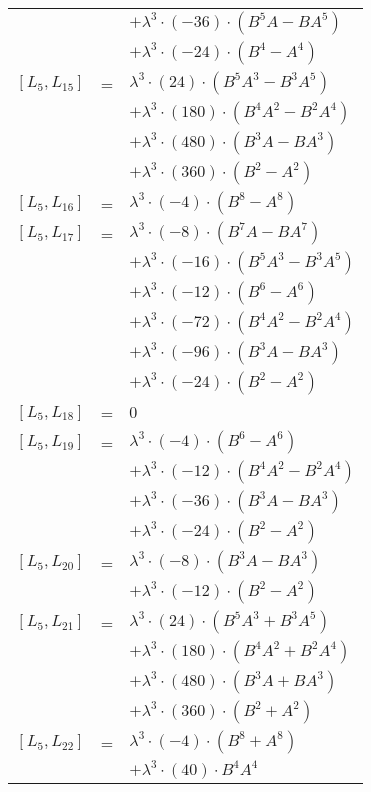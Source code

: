 \documentclass{article}
\begin{document}
\begin{center}
\begin{longtable}{lll}
 & & $ + {\lambda}^3{\cdot}(-36){\cdot}(B^{5}A-BA^{5})$ \\*
 & & $ + {\lambda}^3{\cdot}(-24){\cdot}(B^{4}-A^{4})$ \\
$[L_{5},L_{15}]$ & = & ${\lambda}^3{\cdot}(24){\cdot}(B^{5}A^{3}-B^{3}A^{5})$ \\*
 & & $ + {\lambda}^3{\cdot}(180){\cdot}(B^{4}A^{2}-B^{2}A^{4})$ \\*
 & & $ + {\lambda}^3{\cdot}(480){\cdot}(B^{3}A-BA^{3})$ \\*
 & & $ + {\lambda}^3{\cdot}(360){\cdot}(B^{2}-A^{2})$ \\
$[L_{5},L_{16}]$ & = & ${\lambda}^3{\cdot}(-4){\cdot}(B^{8}-A^{8})$ \\
$[L_{5},L_{17}]$ & = & ${\lambda}^3{\cdot}(-8){\cdot}(B^{7}A-BA^{7})$ \\*
 & & $ + {\lambda}^3{\cdot}(-16){\cdot}(B^{5}A^{3}-B^{3}A^{5})$ \\*
 & & $ + {\lambda}^3{\cdot}(-12){\cdot}(B^{6}-A^{6})$ \\*
 & & $ + {\lambda}^3{\cdot}(-72){\cdot}(B^{4}A^{2}-B^{2}A^{4})$ \\*
 & & $ + {\lambda}^3{\cdot}(-96){\cdot}(B^{3}A-BA^{3})$ \\*
 & & $ + {\lambda}^3{\cdot}(-24){\cdot}(B^{2}-A^{2})$ \\
$[L_{5},L_{18}]$ & = & $ 0 $ \\
$[L_{5},L_{19}]$ & = & ${\lambda}^3{\cdot}(-4){\cdot}(B^{6}-A^{6})$ \\*
 & & $ + {\lambda}^3{\cdot}(-12){\cdot}(B^{4}A^{2}-B^{2}A^{4})$ \\*
 & & $ + {\lambda}^3{\cdot}(-36){\cdot}(B^{3}A-BA^{3})$ \\*
 & & $ + {\lambda}^3{\cdot}(-24){\cdot}(B^{2}-A^{2})$ \\
$[L_{5},L_{20}]$ & = & ${\lambda}^3{\cdot}(-8){\cdot}(B^{3}A-BA^{3})$ \\*
 & & $ + {\lambda}^3{\cdot}(-12){\cdot}(B^{2}-A^{2})$ \\
$[L_{5},L_{21}]$ & = & ${\lambda}^3{\cdot}(24){\cdot}(B^{5}A^{3}+B^{3}A^{5})$ \\*
 & & $ + {\lambda}^3{\cdot}(180){\cdot}(B^{4}A^{2}+B^{2}A^{4})$ \\*
 & & $ + {\lambda}^3{\cdot}(480){\cdot}(B^{3}A+BA^{3})$ \\*
 & & $ + {\lambda}^3{\cdot}(360){\cdot}(B^{2}+A^{2})$ \\
$[L_{5},L_{22}]$ & = & ${\lambda}^3{\cdot}(-4){\cdot}(B^{8}+A^{8})$ \\*
 & & $ + {\lambda}^3{\cdot}(40){\cdot}B^{4}A^{4}$ \\*

\end{longtable}
\end{center}
\end{document}
